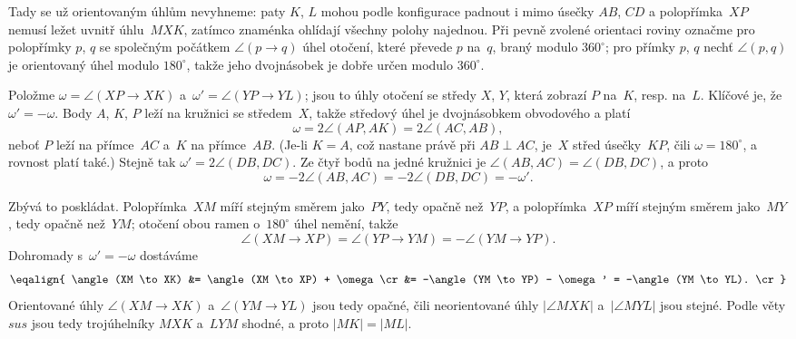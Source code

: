 {    Tady se už orientovaným úhlům nevyhneme: paty $K$, $L$ mohou podle konfigurace padnout i mimo úsečky $AB$, $CD$ a polopřímka~$XP$ nemusí ležet uvnitř úhlu~$MXK$, zatímco znaménka ohlídají všechny polohy najednou. Při pevně zvolené orientaci roviny označme pro polopřímky $p$, $q$ se společným počátkem $\angle(p \to q)$ úhel otočení, které převede $p$ na~$q$, braný modulo $360^\circ$; pro přímky $p$, $q$ nechť $\angle(p,q)$ je orientovaný úhel modulo $180^\circ$, takže jeho dvojnásobek je dobře určen modulo $360^\circ$.

    Položme $\omega = \angle(XP \to XK)$ a~$\omega' = \angle(YP \to YL)$; jsou to úhly otočení se středy $X$, $Y$, která zobrazí $P$ na~$K$, resp. na~$L$. Klíčové je, že $\omega' = -\omega$. Body $A$, $K$, $P$ leží na kružnici se středem~$X$, takže středový úhel je dvojnásobkem obvodového a platí
    $$
    \omega = 2\angle(AP,AK) = 2\angle(AC,AB),
    $$
    neboť $P$ leží na přímce~$AC$ a~$K$ na přímce~$AB$. (Je-li $K = A$, což nastane právě při $AB \perp AC$, je~$X$ střed úsečky~$KP$, čili $\omega = 180^\circ$, a rovnost platí také.) Stejně tak $\omega' = 2\angle(DB,DC)$. Ze čtyř bodů na jedné kružnici je $\angle(AB,AC) = \angle(DB,DC)$, a proto
    $$
    \omega = -2\angle(AB,AC) = -2\angle(DB,DC) = -\omega'.
    $$

    Zbývá to poskládat. Polopřímka~$XM$ míří stejným směrem jako~$PY$, tedy opačně než~$YP$, a polopřímka~$XP$ míří stejným směrem jako~$MY$, tedy opačně než~$YM$; otočení obou ramen o~$180^\circ$ úhel nemění, takže
    $$
    \angle(XM \to XP) = \angle(YP \to YM) = -\angle(YM \to YP).
    $$
    Dohromady s~$\omega' = -\omega$ dostáváme
    $$
    \eqalign{
        \angle(XM \to XK) &= \angle(XM \to XP) + \omega \cr
        &= -\angle(YM \to YP) - \omega' = -\angle(YM \to YL). \cr
    }
    $$
    Orientované úhly $\angle(XM \to XK)$ a~$\angle(YM \to YL)$ jsou tedy opačné, čili neorientované úhly $|\angle MXK|$ a~$|\angle MYL|$ jsou stejné. Podle věty $sus$ jsou tedy trojúhelníky $MXK$ a~$LYM$ shodné, a proto $|MK| = |ML|$.
}


